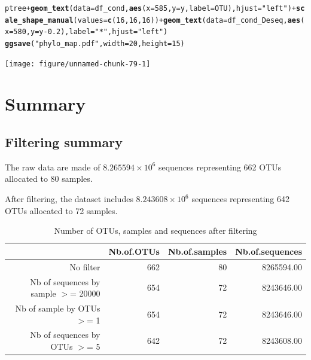 \documentclass[12pt]{article}\usepackage[]{graphicx}\usepackage[]{color}
\makeatletter
\newcommand{\hlnum}[1]{\textcolor[rgb]{0.686,0.059,0.569}{#1}}%
\newcommand{\hlstr}[1]{\textcolor[rgb]{0.192,0.494,0.8}{#1}}%
\newcommand{\hlopt}[1]{\textcolor[rgb]{0,0,0}{#1}}%
\newcommand{\hlstd}[1]{\textcolor[rgb]{0.345,0.345,0.345}{#1}}%
\newcommand{\hlkwc}[1]{\textcolor[rgb]{0.333,0.667,0.333}{#1}}%
\newcommand{\hlkwd}[1]{\textcolor[rgb]{0.737,0.353,0.396}{\textbf{#1}}}%
\newenvironment{kframe}{%
 \def\at@end@of@kframe{}%
 \ifinner\ifhmode%
  \def\at@end@of@kframe{\end{minipage}}%
  \begin{minipage}{\columnwidth}%
 \fi\fi%
 \def\FrameCommand##1{\hskip\@totalleftmargin \hskip-\fboxsep
 \colorbox{shadecolor}{##1}\hskip-\fboxsep
     \hskip-\linewidth \hskip-\@totalleftmargin \hskip\columnwidth}%
 \MakeFramed {\advance\hsize-\width
   \@totalleftmargin\z@ \linewidth\hsize
   \@setminipage}}%
 {\par\unskip\endMakeFramed%
 \at@end@of@kframe}
\newenvironment{knitrout}{}{} %
\numberwithin{figure}{section}
\makeatother
\begin{document}
\begin{knitrout}\small
{}\color{fgcolor}\begin{kframe}
\begin{alltt}
\hlstd{ptree} \hlopt{+} \hlkwd{geom_text}\hlstd{(}\hlkwc{data} \hlstd{= df_cond,} \hlkwd{aes}\hlstd{(}\hlkwc{x} \hlstd{=} \hlnum{585}\hlstd{,} \hlkwc{y} \hlstd{= y,} \hlkwc{label} \hlstd{= OTU),} \hlkwc{hjust} \hlstd{=} \hlstr{"left"}\hlstd{)} \hlopt{+} \hlkwd{scale_shape_manual}\hlstd{(}\hlkwc{values} \hlstd{=} \hlkwd{c}\hlstd{(}\hlnum{16}\hlstd{,} \hlnum{16}\hlstd{,} \hlnum{16}\hlstd{))} \hlopt{+} \hlkwd{geom_text}\hlstd{(}\hlkwc{data} \hlstd{= df_cond_Deseq,} \hlkwd{aes}\hlstd{(}\hlkwc{x} \hlstd{=} \hlnum{580}\hlstd{,} \hlkwc{y} \hlstd{= y}\hlopt{-}\hlnum{0.2}\hlstd{),} \hlkwc{label} \hlstd{=} \hlstr{"*"}\hlstd{,} \hlkwc{hjust} \hlstd{=} \hlstr{"left"}\hlstd{)}
\hlkwd{ggsave}\hlstd{(}\hlstr{"phylo_map.pdf"}\hlstd{,}  \hlkwc{width} \hlstd{=} \hlnum{20}\hlstd{,} \hlkwc{height} \hlstd{=} \hlnum{15}\hlstd{)}
\end{alltt}
\end{kframe}

{\centering \texttt{[image: figure/unnamed-chunk-79-1]} 

}



\end{knitrout}



\section{Summary}
\label{sect:summary}

  \subsection{Filtering summary}

The raw data are made of \ensuremath{8.265594\times 10^{6}} sequences representing 662 OTUs allocated to 80 samples.

After filtering, the dataset includes \ensuremath{8.243608\times 10^{6}} sequences representing 642 OTUs allocated to 72 samples.

\begin{table}[ht]
\centering
\begin{tabular}{rrrr}
  \hline
 & Nb.of.OTUs & Nb.of.samples & Nb.of.sequences \\ 
  \hline
No filter & 662 &  80 & 8265594.00 \\ 
  Nb of sequences by sample $>$=  20000 & 654 &  72 & 8243646.00 \\ 
  Nb of sample by OTUs $>$=  1 & 654 &  72 & 8243646.00 \\ 
  Nb of sequences by OTUs $>$=  5 & 642 &  72 & 8243608.00 \\ 
   \hline
\end{tabular}
\caption{Number of OTUs, samples and sequences after filtering} 
\end{table}
\end{document}
